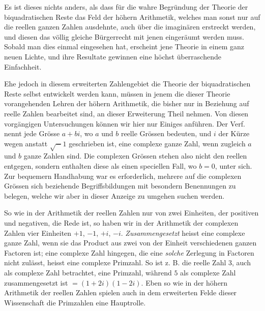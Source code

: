 Es ist dieses nichts anders, als dass für die wahre Begründung der Theorie der biquadratischen Reste das Feld der höhern Arithmetik, welches man sonst nur auf die reellen ganzen Zahlen ausdehnte, auch über die imaginären erstreckt werden, und diesen das völlig gleiche Bürgerrecht mit jenen eingeräumt werden muss. Sobald man dies einmal eingesehen hat, erscheint jene Theorie in einem ganz neuen Lichte, und ihre Resultate gewinnen eine höchst überraschende Einfachheit.

Ehe jedoch in diesem erweiterten Zahlengebiet die Theorie der biquadratischen Reste selbst entwickelt werden kann, müssen in jenem die dieser Theorie vorangehenden Lehren der höhern Arithmetik, die bisher nur in Beziehung auf reelle Zahlen bearbeitet sind, an dieser Erweiterung Theil nehmen. Von diesen vorgängigen Untersuchungen können wir hier nur Einiges anführen. Der Verf. nennt jede Grösse $a+bi$, wo $a$ und $b$ reelle Grössen bedeuten, und $i$ der Kürze wegen anstatt $\surd-1$ geschrieben ist, eine complexe ganze Zahl, wenn zugleich $a$ und $b$ ganze Zahlen sind. Die complexen Grössen stehen also nicht den reellen entgegen, sondern enthalten diese als einen speciellen Fall, wo $b=0$, unter sich. Zur bequemern Handhabung war es erforderlich, mehrere auf die complexen Grössen sich beziehende Begriffsbildungen mit besondern Benennungen zu belegen, welche wir aber in dieser Anzeige zu umgehen suchen werden.

So wie in der Arithmetik der reellen Zahlen nur von zwei Einheiten, der positiven und negativen, die Rede ist, so haben wir in der Arithmetik der 
%
complexen Zahlen vier Einheiten $+1$, $-1$, $+i$, $-i$. \emph{Zusammengesetzt} heisst eine complexe ganze Zahl, wenn sie das Product aus zwei von der Einheit verschiedenen ganzen Factoren ist; eine complexe Zahl hingegen, die eine \emph{solche} Zerlegung in Factoren nicht zulässt, heisst eine complexe Primzahl. So ist z. B. die reelle Zahl $3$, auch als complexe Zahl betrachtet, eine Primzahl, während $5$ als complexe Zahl zusammengesetzt ist $=(1+2i)(1-2i)$. Eben so wie in der höhern Arithmetik der reellen Zahlen spielen auch in dem erweiterten Felde dieser Wissenschaft die Primzahlen eine Hauptrolle.

